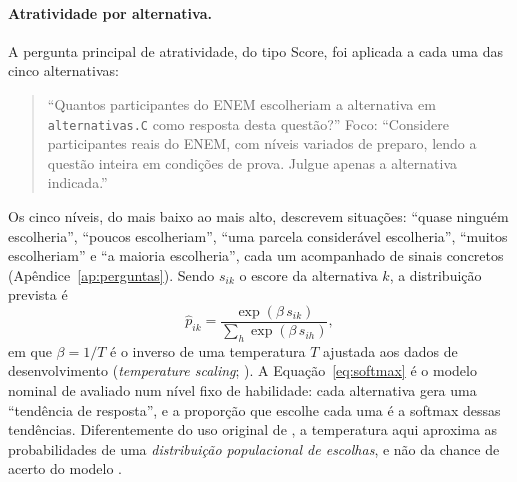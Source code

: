 \paragraph{Atratividade por alternativa.} A pergunta principal de atratividade, do tipo Score, foi aplicada a cada uma das cinco alternativas:
\begin{quote}
\small ``Quantos participantes do ENEM escolheriam a alternativa em \texttt{alternativas.C} como resposta desta questão?'' Foco: ``Considere participantes reais do ENEM, com níveis variados de preparo, lendo a questão inteira em condições de prova. Julgue apenas a alternativa indicada.''
\end{quote}
Os cinco níveis, do mais baixo ao mais alto, descrevem situações: ``quase ninguém escolheria'', ``poucos escolheriam'', ``uma parcela considerável escolheria'', ``muitos escolheriam'' e ``a maioria escolheria'', cada um acompanhado de sinais concretos (Apêndice~\ref{ap:perguntas}). Sendo $s_{ik}$ o escore da alternativa $k$, a distribuição prevista é
\begin{equation}\label{eq:softmax}
\hat{p}_{ik} = \frac{\exp(\beta\, s_{ik})}{\sum_{h} \exp(\beta\, s_{ih})},
\end{equation}
em que $\beta = 1/T$ é o inverso de uma temperatura $T$ ajustada aos dados de desenvolvimento (\textit{temperature scaling}; \citealp{guo2017}). A Equação~\eqref{eq:softmax} é o modelo nominal de \citet{bock1972} avaliado num nível fixo de habilidade: cada alternativa gera uma ``tendência de resposta'', e a proporção que escolhe cada uma é a softmax dessas tendências. Diferentemente do uso original de \citet{guo2017}, a temperatura aqui aproxima as probabilidades de uma \emph{distribuição populacional de escolhas}, e não da chance de acerto do modelo \citep{liusie2023,saeuberli2025}.

